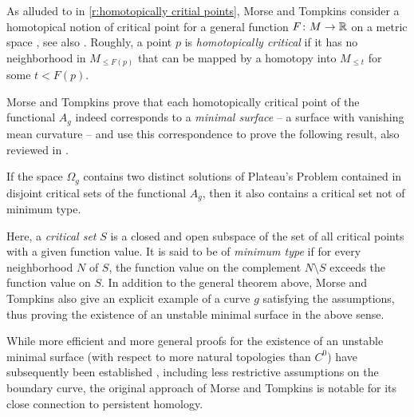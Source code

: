As alluded to in \cref{r:homotopically critial points}, Morse and Tompkins consider a homotopical notion of critical point for a general function $F \colon M \to \mathbb{R}$ on a metric space \cite[p.~445]{Morse.1939}, see also \cite{Morse.1943}.
Roughly, a point $p$ is \emph{homotopically critical} if it has no neighborhood in $M_{\leq F(p)}$ that can be mapped by a homotopy into $M_{\leq t}$ for some $t<F(p)$.

Morse and Tompkins prove \cite[p.~464]{Morse.1939} that each homotopically critical point of the functional $A_g$ indeed corresponds to 
%
a \emph{minimal surface} -- a surface with vanishing mean curvature -- and use this correspondence to prove the following result, also reviewed in \cite[Theorem II.6.10]{Struwe.1988}.

\begin{thm}
	If the space $\Omega_g$ contains two distinct solutions of Plateau's Problem contained in disjoint critical sets of the functional $A_g$, then it also contains a critical set not of minimum type.
\end{thm}
Here, a \emph{critical set} $S$ is a closed and open subspace of the set of all critical points with a given function value.
It is said to be of \emph{minimum type} if for every neighborhood $N$ of $S$, the function value on the complement $N \setminus S$ exceeds the function value on $S$. 
In addition to the general theorem above, Morse and Tompkins also give an explicit example of a curve $g$ satisfying the assumptions, thus proving the existence of an unstable minimal surface in the above sense.

%

While more efficient and more general proofs for the existence of an unstable minimal surface (with respect to more natural topologies than $C^0$) have subsequently been established \cite{Struwe.1988,Dierkes.2010}, including less restrictive assumptions on the boundary curve, the original approach of Morse and Tompkins is notable for its close connection to persistent homology.


